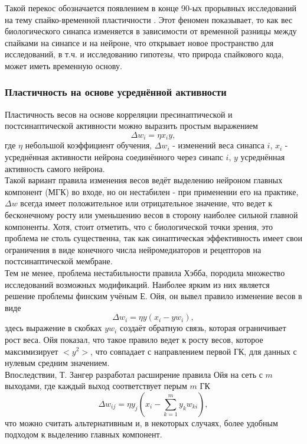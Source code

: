 \documentclass[a4paper,10pt]{article}
\begin{document}
\indent Такой перекос обозначается появлением в конце 90-ых прорывных исследований на тему спайко-временной пластичности \cite{stdp1,stdp2,stdp3,stdp4}. Этот феномен показывает, то как вес биологического синапса изменяется в зависимости от временной разницы между спайками на синапсе и на нейроне, что открывает новое пространство для исследований, в т.ч. и исследованию гипотезы, что природа спайкового кода, может иметь временную основу.\\

\subsubsection{Пластичность на основе усреднённой активности}\label{sec:hebb}
\indent Пластичность весов на основе корреляции пресинаптической и постсинаптической активности можно выразить простым выражением
\begin{equation}
\Delta w_{i} = \eta x_{i}y,
\end{equation}
где $\eta$ небольшой коэффициент обучения, $\Delta w_{i}$ - изменений веса синапса $i$, $x_{i}$ - усреднённая активности нейрона соединённого через синапс $i$, $y$ усреднённая активность самого нейрона.\\
\indent Такой вариант правила изменения весов ведёт выделению нейроном главных компонент (МГК) во входе, но он нестабилен - при применении его на практике, $\Delta w$ всегда имеет положительное или отрицательное значение, что ведет к бесконечному росту или уменьшению весов в сторону наиболее сильной главной компоненты. Хотя, стоит отметить, что с биологической точки зрения, это проблема не столь существенна, так как синаптическая эффективность имеет свои ограничения в виде конечного числа нейромедиаторов и рецепторов на постсинаптической мембране\cite{NeuralAndAdaptiveSystems}.\\
\indent Тем не менее, проблема нестабильности правила Хэбба, породила множество исследований возможных модификаций. Наиболее ярким из них является решение проблемы финским учёным Е. Ойя, он вывел правило изменение весов в виде
\begin{equation}
\Delta w_{i} = \eta y (x_{i} - yw_{i}),
\end{equation}
здесь выражение в скобках $yw_{i}$ создаёт обратную связь, которая ограничивает рост веса. Ойя показал, что такое правило ведет к росту весов, которое максимизирует $<y^2>$, что совпадает с направлением первой ГК, для данных с нулевым средним значением.\\
\indent Впоследствии, Т. Зангер разработал расширение правила Ойя на сеть с $m$ выходами, где каждый выход соответствует перым $m$ ГК
\begin{equation}
\Delta w_{ij} = \eta y_{j} (x_{i} - \sum_{k=1}^{m}y_{k}w_{ki}),
\end{equation}
что можно считать альтернативным и, в некоторых случаях, более удобным подходом к выделению главных компонент.
\end{document}
